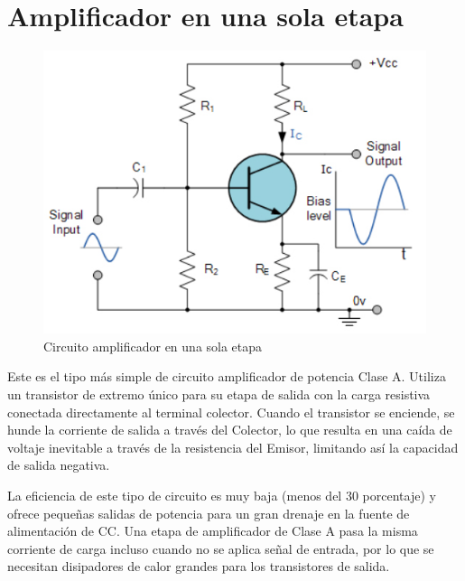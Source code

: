 \documentclass[12pt,a4paper]{article}
\begin{document}
\section*{Amplificador en una sola etapa}
\begin{figure}[hbtp]
\centering
\includegraphics[scale=0.7]{Circuitos/5.png}
\caption{Circuito amplificador en una sola etapa}
\end{figure}
Este es el tipo más simple de circuito amplificador de potencia Clase A. Utiliza un transistor de extremo único para su etapa de salida con la carga resistiva conectada directamente al terminal colector. Cuando el transistor se enciende, se hunde la corriente de salida a través del Colector, lo que resulta en una caída de voltaje inevitable a través de la resistencia del Emisor, limitando así la capacidad de salida negativa.

La eficiencia de este tipo de circuito es muy baja (menos del 30 porcentaje) y ofrece pequeñas salidas de potencia para un gran drenaje en la fuente de alimentación de CC. Una etapa de amplificador de Clase A pasa la misma corriente de carga incluso cuando no se aplica señal de entrada, por lo que se necesitan disipadores de calor grandes para los transistores de salida.

\newpage
\end{document}
